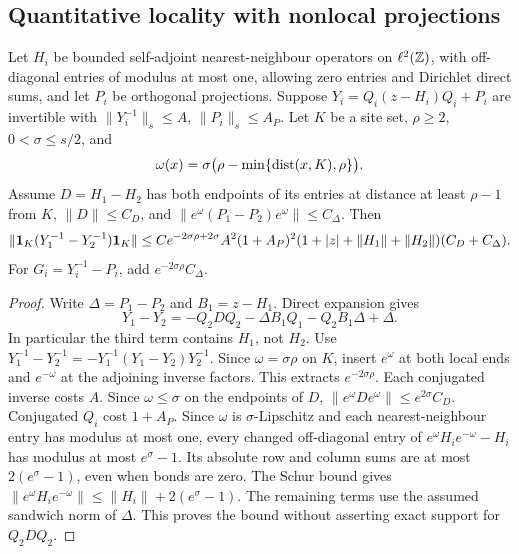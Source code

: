 \subsection{Quantitative locality with nonlocal projections}
\begin{lemma}\label{lem:belowlocality}
Let $H_i$ be bounded self-adjoint nearest-neighbour operators on $\ell^2(\mathbb Z)$, with off-diagonal entries of modulus at most one, allowing zero entries and Dirichlet direct sums, and let $P_i$ be orthogonal projections. Suppose
$Y_i=Q_i(z-H_i)Q_i+P_i$ are invertible with
$\|Y_i^{-1}\|_s\le A$, $\|P_i\|_s\le A_P$.
Let $K$ be a site set, $\rho\ge2$, $0<\sigma\le s/2$, and
\[
 \omega(x)=\sigma\bigl(\rho-\min\{\operatorname{dist}(x,K),\rho\}\bigr).
\]
Assume $D=H_1-H_2$ has both endpoints of its entries at distance at least $\rho-1$ from $K$, $\|D\|\le C_D$, and
$\|e^\omega(P_1-P_2)e^\omega\|\le C_\Delta$.
Then
\[
 \|\mathbf 1_K(Y_1^{-1}-Y_2^{-1})\mathbf 1_K\|
 \le C e^{-2\sigma\rho+2\sigma}A^2(1+A_P)^2
       (1+|z|+\|H_1\|+\|H_2\|)(C_D+C_\Delta).
\]
For $G_i=Y_i^{-1}-P_i$, add $e^{-2\sigma\rho}C_\Delta$.
\end{lemma}
\begin{proof}
Write $\Delta=P_1-P_2$ and $B_1=z-H_1$. Direct expansion gives
\begin{equation}\label{eq:belowlocalidentity}
 Y_1-Y_2=-Q_2DQ_2-\Delta B_1Q_1-Q_2B_1\Delta+\Delta.
\end{equation}
In particular the third term contains $H_1$, not $H_2$.
Use $Y_1^{-1}-Y_2^{-1}=-Y_1^{-1}(Y_1-Y_2)Y_2^{-1}$.
Since $\omega=\sigma\rho$ on $K$, insert $e^\omega$ at both local ends and $e^{-\omega}$ at the adjoining inverse factors. This extracts $e^{-2\sigma\rho}$. Each conjugated inverse costs $A$. Since $\omega\le\sigma$ on the endpoints of $D$,
$\|e^\omega D e^\omega\|\le e^{2\sigma}C_D$.
Conjugated $Q_i$ cost $1+A_P$. Since $\omega$ is $\sigma$-Lipschitz and each nearest-neighbour entry has modulus at most one, every changed off-diagonal entry of $e^\omega H_ie^{-\omega}-H_i$ has modulus at most $e^\sigma-1$. Its absolute row and column sums are at most $2(e^\sigma-1)$, even when bonds are zero. The Schur bound gives
$\|e^\omega H_ie^{-\omega}\|\le\|H_i\|+2(e^\sigma-1)$.
The remaining terms use the assumed sandwich norm of $\Delta$.
This proves the bound without asserting exact support for $Q_2DQ_2$.
\end{proof}

